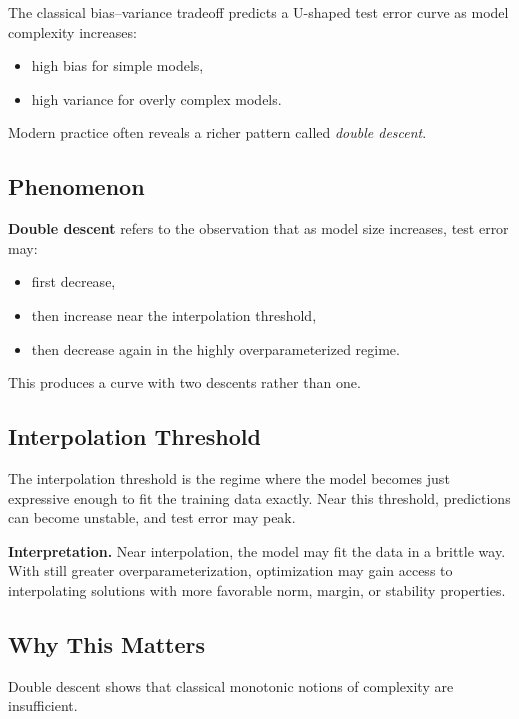 The classical bias--variance tradeoff predicts a U-shaped test error curve as model complexity increases:
\begin{itemize}
    \item high bias for simple models,
    \item high variance for overly complex models.
\end{itemize}

Modern practice often reveals a richer pattern called \emph{double descent}.

\subsection{Phenomenon}

\textbf{Double descent} refers to the observation that as model size increases, test error may:
\begin{itemize}
    \item first decrease,
    \item then increase near the interpolation threshold,
    \item then decrease again in the highly overparameterized regime.
\end{itemize}

\medskip

\noindent
This produces a curve with two descents rather than one.

\subsection{Interpolation Threshold}

The interpolation threshold is the regime where the model becomes just expressive enough to fit the training data exactly. Near this threshold, predictions can become unstable, and test error may peak.

\medskip

\noindent
\textbf{Interpretation.}
Near interpolation, the model may fit the data in a brittle way. With still greater overparameterization, optimization may gain access to interpolating solutions with more favorable norm, margin, or stability properties.

\subsection{Why This Matters}

Double descent shows that classical monotonic notions of complexity are insufficient.

